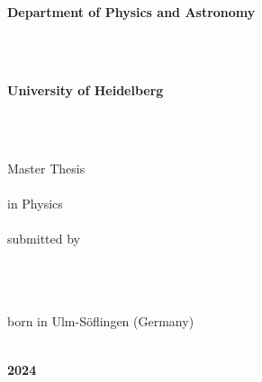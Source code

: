 \begin{titlepage}
    \begin{center}

        \begin{Large}
            \textbf{Department of Physics and Astronomy}
        \end{Large}
        \\ \ \\

        \begin{large}
            \textbf{University of Heidelberg}
        \end{large}
        \\ \ \\

        \vfill
        
        Master Thesis 
        \\ \ \\

        in Physics 
        \\ \ \\

        submitted by 
        \\ \ \\

        \begin{Large}
            \textbf{\theauthor} 
        \end{Large}
        \\ \ \\

        born in Ulm-Söflingen (Germany) 
        \\ \ \\

        \begin{Large}
            \textbf{2024}
        \end{Large}

    \end{center}
\end{titlepage}

\begin{titlepage}
    \ 
\end{titlepage}


